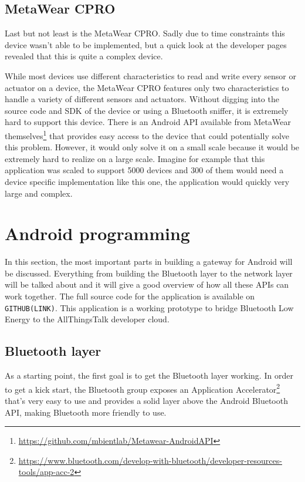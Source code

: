 \documentclass[pdftex,a4paper,12pt,twoside]{report}
\begin{document}
\subsection{MetaWear CPRO}
\label{subsec:achievementsmetawear}
Last but not least is the MetaWear CPRO. Sadly due to time constraints this device wasn't able to be implemented, but a quick look at the developer pages revealed that this is quite a complex device.

While most devices use different characteristics to read and write every sensor or actuator on a device, the MetaWear CPRO features only two characteristics to handle a variety of different sensors and actuators. Without digging into the source code and SDK of the device or using a Bluetooth sniffer, it is extremely hard to support this device. There is an Android API available from MetaWear themselves\footnote{\url{https://github.com/mbientlab/Metawear-AndroidAPI}} that provides easy access to the device that could potentially solve this problem. However, it would only solve it on a small scale because it would be extremely hard to realize on a large scale. Imagine for example that this application was scaled to support 5000 devices and 300 of them would need a device specific implementation like this one, the application would quickly very large and complex.

\section{Android programming}
\label{sec:androidprogramming}
In this section, the most important parts in building a gateway for Android will be discussed. Everything from building the Bluetooth layer to the network layer will be talked about and it will give a good overview of how all these APIs can work together. The full source code for the application is available on \texttt{GITHUB(LINK)}. This application is a working prototype to bridge Bluetooth Low Energy to the AllThingsTalk developer cloud.

\subsection{Bluetooth layer}
\label{subsec:bluetoothlayer}
As a starting point, the first goal is to get the Bluetooth layer working. In order to get a kick start, the Bluetooth group exposes an Application Accelerator\footnote{\url{https://www.bluetooth.com/develop-with-bluetooth/developer-resources-tools/app-acc-2}} that's very easy to use and provides a solid layer above the Android Bluetooth API, making Bluetooth more friendly to use.
\end{document}
